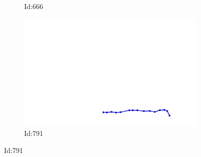 \documentclass[12pt,twoside]{report}
\begin{document}
\begin{figure}
\begin{subfigure}[b]{0.20\textwidth}
\caption{Id:666}
\end{subfigure}
\begin{subfigure}[b]{0.20\textwidth}
\centering
\includegraphics[width=\textwidth]{../../trajectories/791.png}
\caption{Id:791}
\end{subfigure}
\end{figure}
\end{document}
